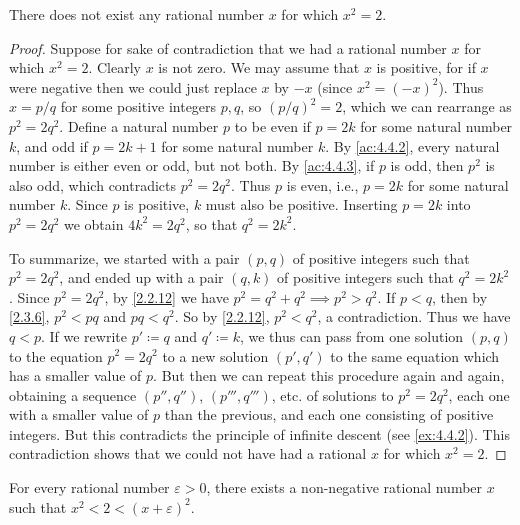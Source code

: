\begin{prop}\label{4.4.4}
  There does not exist any rational number \(x\) for which \(x^2 = 2\).
\end{prop}

\begin{proof}
  Suppose for sake of contradiction that we had a rational number \(x\) for which \(x^2 = 2\).
  Clearly \(x\) is not zero.
  We may assume that \(x\) is positive, for if \(x\) were negative then we could just replace \(x\) by \(-x\)
  (since \(x^2 = (-x)^2\)).
  Thus \(x = p / q\) for some positive integers \(p, q\), so \((p / q)^2 = 2\), which we can rearrange as \(p^2 = 2q^2\).
  Define a natural number \(p\) to be even if \(p = 2k\) for some natural number \(k\), and odd if \(p = 2k + 1\) for some natural number \(k\).
  By \cref{ac:4.4.2}, every natural number is either even or odd, but not both.
  By \cref{ac:4.4.3}, if \(p\) is odd, then \(p^2\) is also odd, which contradicts \(p^2 = 2q^2\).
  Thus \(p\) is even, i.e., \(p = 2k\) for some natural number \(k\).
  Since \(p\) is positive, \(k\) must also be positive.
  Inserting \(p = 2k\) into \(p^2 = 2q^2\) we obtain \(4k^2 = 2q^2\), so that \(q^2 = 2k^2\).

  To summarize, we started with a pair \((p, q)\) of positive integers such that \(p^2 = 2q^2\), and ended up with a pair \((q, k)\) of positive integers such that \(q^2 = 2k^2\).
  Since \(p^2 = 2q^2\), by \cref{2.2.12} we have \(p^2 = q^2 + q^2 \implies p^2 > q^2\).
  If \(p < q\), then by \cref{2.3.6}, \(p^2 < pq\) and \(pq < q^2\).
  So by \cref{2.2.12}, \(p^2 < q^2\), a contradiction.
  Thus we have \(q < p\).
  If we rewrite \(p' \coloneqq q\) and \(q' \coloneqq k\), we thus can pass from one solution \((p, q)\) to the equation \(p^2 = 2q^2\) to a new solution \((p', q')\) to the same equation which has a smaller value of \(p\).
  But then we can repeat this procedure again and again, obtaining a sequence \((p'', q'')\), \((p''', q''')\), etc. of solutions to \(p^2 = 2q^2\), each one with a smaller value of \(p\) than the previous, and each one consisting of positive integers.
  But this contradicts the principle of infinite descent (see \cref{ex:4.4.2}).
  This contradiction shows that we could not have had a rational \(x\) for which \(x^2 = 2\).
\end{proof}

\begin{prop}\label{4.4.5}
  For every rational number \(\varepsilon > 0\), there exists a non-negative rational number \(x\) such that \(x^2 < 2 < (x + \varepsilon)^2\).
\end{prop}


